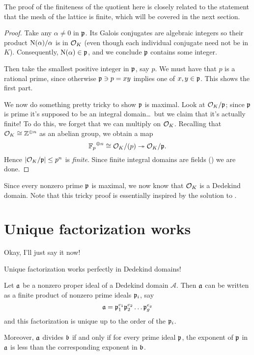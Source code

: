 The proof of the finiteness of the quotient here is closely related to the
statement that the mesh of the lattice is finite,
which will be covered in the next section.
\begin{proof}
	Take any $\alpha \neq 0$ in $\mathfrak p$.
	Its Galois conjugates are algebraic integers
	so their product $\operatorname{N}(\alpha)/\alpha$ is in $\mathcal O_K$
	(even though each individual conjugate need not be in $K$).
	Consequently, $\operatorname{N}(\alpha) \in \mathfrak p$,
	and we conclude $\mathfrak p$ contains some integer.

	Then take the smallest positive integer in $\mathfrak p$, say $p$.
	We must have that $p$ is a rational prime, since otherwise $\mathfrak p \ni p = xy$
	implies one of $x,y \in \mathfrak p$.
	This shows the first part.

	We now do something pretty tricky to show $\mathfrak p$ is maximal.
	Look at $\mathcal O_K / \mathfrak p$;
	since $\mathfrak p$ is prime it's supposed to be an integral domain\dots\
	but we claim that it's actually finite!
	To do this, we forget that we can multiply on $\mathcal O_K$.
	Recalling that $\mathcal O_K \cong \mathbb Z^{\oplus n}$ as an abelian group,
	we obtain a map
	\[ {\mathbb F_p}^{\oplus n} \cong \mathcal O_K / (p) \twoheadrightarrow \mathcal O_K / \mathfrak p. \]
	Hence $\left\lvert \mathcal O_K / \mathfrak p \right\rvert \le p^n$ is \emph{finite}.
	Since finite integral domains are fields ()
	we are done.
\end{proof}
Since every nonzero prime $\mathfrak p$ is maximal, we now know that $\mathcal O_K$ is a Dedekind domain.
Note that this tricky proof is essentially inspired by the solution to .


\section{Unique factorization works}
Okay, I'll just say it now!
\begin{moral}
	Unique factorization works perfectly in Dedekind domains!
\end{moral}
\begin{theorem}
	Let $\mathfrak a$ be a nonzero proper ideal of a Dedekind domain $\mathcal A$.
	Then $\mathfrak a$ can be written as a finite product of nonzero prime ideals $\mathfrak p_i$, say
	\[ \mathfrak a = \mathfrak p_1^{e_1} \mathfrak p_2^{e_2} \dots \mathfrak p_g^{e_g} \]
	and this factorization is unique up to the order of the $\mathfrak p_i$.

	Moreover, $\mathfrak a$ divides $\mathfrak b$ if and only if for every prime ideal $\mathfrak p$,
	the exponent of $\mathfrak p$ in $\mathfrak a$ is less than the corresponding exponent in $\mathfrak b$.
\end{theorem}

